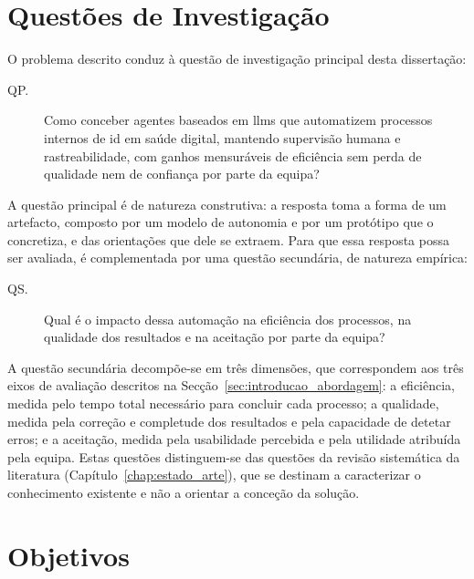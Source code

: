 \section{Questões de Investigação}
\label{sec:introducao_questoes}

O problema descrito conduz à questão de investigação principal desta dissertação:

\begin{description}
  \item[QP.] Como conceber agentes baseados em \glspl{llm} que automatizem processos internos de \gls{id} em saúde digital, mantendo supervisão humana e rastreabilidade, com ganhos mensuráveis de eficiência sem perda de qualidade nem de confiança por parte da equipa?
\end{description}

A questão principal é de natureza construtiva: a resposta toma a forma de um artefacto, composto por um modelo de autonomia e por um protótipo que o concretiza, e das orientações que dele se extraem. Para que essa resposta possa ser avaliada, é complementada por uma questão secundária, de natureza empírica:

\begin{description}
  \item[QS.] Qual é o impacto dessa automação na eficiência dos processos, na qualidade dos resultados e na aceitação por parte da equipa?
\end{description}

A questão secundária decompõe-se em três dimensões, que correspondem aos três eixos de avaliação descritos na Secção~\ref{sec:introducao_abordagem}: a eficiência, medida pelo tempo total necessário para concluir cada processo; a qualidade, medida pela correção e completude dos resultados e pela capacidade de detetar erros; e a aceitação, medida pela usabilidade percebida e pela utilidade atribuída pela equipa. Estas questões distinguem-se das questões da revisão sistemática da literatura (Capítulo~\ref{chap:estado_arte}), que se destinam a caracterizar o conhecimento existente e não a orientar a conceção da solução.

\section{Objetivos}
\label{sec:introducao_objetivos}

